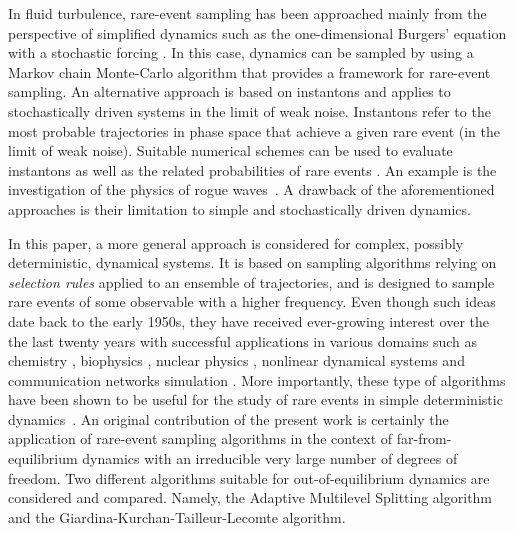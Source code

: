 \documentclass[pre,aps,floatfix,10pt,superscriptaddress, notitlepage,preprint]{revtex4-1}
\newcommand{\EL}[1]{{\color{myred}{#1}}}
\begin{document}
%
In fluid turbulence, rare-event sampling has been approached mainly from the perspective of simplified dynamics such as the one-dimensional Burgers' equation with a stochastic forcing \cite{bec_burgers_2007}. In this case, dynamics can be sampled by using a Markov chain Monte-Carlo algorithm \cite{duben_monte_2008,mesterhazy2011anomalous,mesterhazy2013lattice} that provides a framework for rare-event sampling.
%
An alternative approach is based on instantons \cite{gurarie_instantons_1996,grafke2015instanton} and applies to stochastically driven systems in the limit of weak noise.
Instantons refer to the most probable trajectories in phase space that achieve a given rare event (in the limit of weak noise). Suitable numerical schemes can be used to evaluate instantons as well as the related probabilities of rare events \cite{chernykh_large_2001,grafke_instanton_2013,grigorio_instantons_2017,laurie2015computation,bouchet2014langevin}.
An example is the investigation of the physics of rogue waves~\cite{dematteis2018rogue,dematteis2019experimental}.
%
A drawback of the aforementioned approaches is their limitation to simple and stochastically driven dynamics.
%

%
In this paper, a more general approach is considered for complex, possibly deterministic, dynamical systems.
It is based on sampling algorithms relying on \emph{selection rules} applied to an ensemble of trajectories, and is designed to sample rare events of some observable with a higher frequency.
%    
%
Even though such ideas date back to the early 1950s, they have received ever-growing interest over the the last twenty years with successful applications in various domains such as chemistry \cite{van_erp_elaborating_2005,escobedo_transition_2009,teo_adaptive_2016}, biophysics \cite{huber_weighted-ensemble_1996,zuckerman2017weighted,bolhuis2005kinetic}, nuclear physics \cite{louvin2017}, nonlinear dynamical systems \cite{tailleur_probing_2007} and communication networks simulation \cite{villen-altamirano_restart:_1994}.
More importantly, these type of algorithms have been shown to be useful for the study of rare events in simple deterministic dynamics~\cite{wouters2016rare}.
%
%
An original contribution of the present work is certainly the application of rare-event sampling algorithms in the context of far-from-equilibrium dynamics with an irreducible very large number of degrees of freedom. 
% 
Two different algorithms suitable for out-of-equilibrium dynamics are considered and compared. Namely, the Adaptive Multilevel Splitting algorithm and the Giardina-Kurchan-Tailleur-Lecomte algorithm.
%
	
\end{document}
